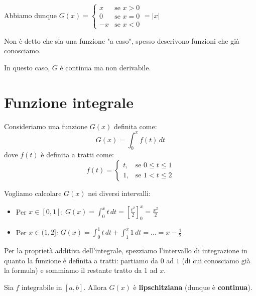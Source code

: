 \documentclass[12pt]{report}
\begin{document}
	Abbiamo dunque $G(x) = \begin{cases} x & \text{se } x > 0 \\ 0 & \text{se } x = 0 \\ -x & \text{se } x < 0 \end{cases} = |x|$
	
	Non è detto che sia una funzione "a caso", spesso descrivono funzioni che già conosciamo.
	
	In questo caso, $G$ è continua ma non derivabile.
	
	\section{Funzione integrale}
	
	Consideriamo una funzione $G(x)$ definita come:
	\[
	G(x) = \int_{0}^{x} f(t) \, dt
	\]
	dove $f(t)$ è definita a tratti come:
	\[
	f(t) = \begin{cases}
		t, & \text{se } 0 \leq t \leq 1 \\
		1, & \text{se } 1 < t \leq 2
	\end{cases}
	\]
	
	Vogliamo calcolare $G(x)$ nei diversi intervalli:
	\begin{itemize}
		
		\item Per $x \in [0, 1]$: $G(x) = \int_{0}^{x} t \, dt = \left[ \frac{t^2}{2} \right]_{0}^{x} = \frac{x^2}{2}$
		
		\item Per $x \in (1, 2]$: $G(x) = \int_{0}^{1} t \, dt + \int_{1}^{x} 1 \, dt = \dots = x - \frac{1}{2}$
		
	\end{itemize}
	
	Per la proprietà additiva dell'integrale, spezziamo l'intervallo di integrazione in quanto la funzione è definita a tratti: partiamo da $0$ ad $1$ (di cui conosciamo già la formula) e sommiamo il restante tratto da $1$ ad $x$.
	
	\begin{proposizione}{}{}
		
		Sia $f$ integrabile in $[a, b]$. Allora $G(x)$ è \textbf{lipschitziana} (dunque è \textbf{continua}).
		
	\end{proposizione}
	
\end{document}
